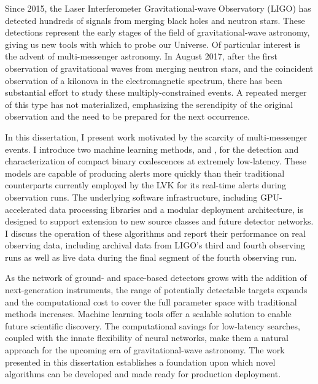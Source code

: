 
Since 2015, the Laser Interferometer Gravitational-wave Observatory (LIGO) has detected hundreds of signals from merging black holes and neutron stars.
These detections represent the early stages of the field of gravitational-wave astronomy, giving us new tools with which to probe our Universe.
Of particular interest is the advent of multi-messenger astronomy.
In August 2017, after the first observation of gravitational waves from merging neutron stars, and the coincident observation of a kilonova in the electromagnetic spectrum, there has been substantial effort to study these multiply-constrained events.
A repeated merger of this type has not materialized, emphasizing the serendipity of the original observation and the need to be prepared for the next occurrence.

In this dissertation, I present work motivated by the scarcity of multi-messenger events.
I introduce two machine learning methods, \aframe and \amplfi, for the detection and characterization of compact binary coalescences at extremely low-latency.
These models are capable of producing alerts more quickly than their traditional counterparts currently employed by the LVK for its real-time alerts during observation runs.
The underlying software infrastructure, including GPU-accelerated data processing libraries and a modular deployment architecture, is designed to support extension to new source classes and future detector networks.
I discuss the operation of these algorithms and report their performance on real observing data, including archival data from LIGO's third and fourth observing runs as well as live data during the final segment of the fourth observing run.

As the network of ground- and space-based detectors grows with the addition of next-generation instruments, the range of potentially detectable targets expands and the computational cost to cover the full parameter space with traditional methods increases.
Machine learning tools offer a scalable solution to enable future scientific discovery.
The computational savings for low-latency searches, coupled with the innate flexibility of neural networks, make them a natural approach for the upcoming era of gravitational-wave astronomy.
The work presented in this dissertation establishes a foundation upon which novel algorithms can be developed and made ready for production deployment.




